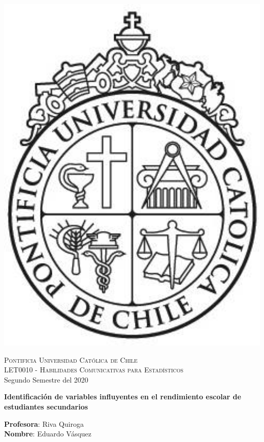 \documentclass[
]{article}
\author{}
\date{\vspace{-2.5em}}
\begin{document}
\begin{minipage}{2cm}
    \includegraphics[width=1.2\textwidth]{archivos-rmd/logo-uc.jpg}
\end{minipage}

\begin{flushleft}
\noindent \textsc{Pontificia Universidad Cat\'olica de Chile \\
LET0010 - Habilidades Comunicativas para Estadísticos} \\
\noindent Segundo Semestre del 2020
\end{flushleft}

\vspace{10mm}
\begin{center}
\textbf{ \Large{Identificación de variables influyentes en el rendimiento escolar de estudiantes secundarios}}
\end{center}

\begin{flushright}
\noindent \textbf{Profesora}: Riva Quiroga\\
\noindent \textbf{Nombre}: Eduardo Vásquez
\end{flushright}
\end{document}
